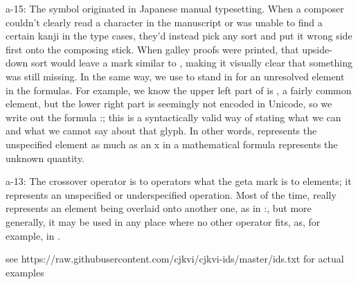 \begin{multicols}{2}
{\mktsStyleBold{}a-15}: The symbol \cjkgGlue{} originated in Japanese manual typesetting. When a composer
couldn’t clearly read a character in the manuscript or was unable to find
a certain kanji in the type cases, they’d instead pick any sort and
put it wrong side first onto the composing stick. When galley proofs were
printed, that upside-down sort would leave a mark similar to \cjkgGlue{}, making it
visually clear that something was still missing. In the same way, we
use \cjkgGlue{} to stand in for an unresolved element in the formulas. For
example, we know the upper left part of \cjkgGlue{} is \cjkgGlue{}, a fairly common element,
but the lower right part is seemingly not encoded in Unicode, so we write
out the formula \cjkgGlue{}:\cjkgGlue{}\cjkgGlue{}; this is a syntactically valid way of stating what
we can and what we cannot say about that glyph. In other words,
\cjkgGlue{} represents the unspecified element as much as an {\mktsStyleItalic{}x\/} in a mathematical
formula represents the unknown quantity.

{\mktsStyleBold{}a-13}: The crossover operator \cjkgGlue{} is to operators what the geta mark
\cjkgGlue{} is to elements; it represents an unspecified or underspecified operation. Most of
the time, \cjkgGlue{} really represents an element being overlaid onto another
one, as in \cjkgGlue{}:\cjkgGlue{}\cjkgGlue{}, but more generally, it may be used in any place
where no other operator fits, as, for example, in \cjkgGlue{}.



\begin{mktsEnNotes}{\mktsEnStyleMarkNotes{}\mktsEnMarkAfter{}}see
{\mktsStyleUrl{}https:\g/\g/\g\allowbreak{}raw.githubusercontent.com\g/\g\allowbreak{}cjkvi\g/\g\allowbreak{}cjkvi-\g\allowbreak{}ids\g/\g\allowbreak{}master\g/\g\allowbreak{}ids.txt} for actual examples


\end{mktsEnNotes}
\end{multicols}
